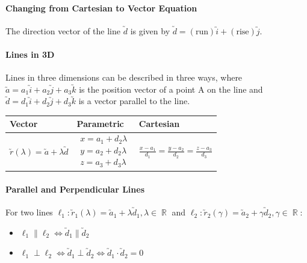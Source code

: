 \documentclass[a4paper,twoside]{article}
\DeclareMathOperator\R{\mathbb{R}}
\begin{document}
			\paragraph{Changing from Cartesian to Vector Equation} The direction vector of the line $\utilde{d}$ is given by $\utilde{d}=\mathrm{(run)}\utilde{i}+\mathrm{(rise)}\utilde{j}$.
			
			\paragraph{Lines in 3D} Lines in three dimensions can be described in three ways, where $\utilde{a}=a_1\utilde{i}+a_2\utilde{j}+a_3\utilde{k}$ is the position vector of a point A on the line and $\utilde{d}=d_1\utilde{i}+d_2\utilde{j}+d_3\utilde{k}$ is a vector parallel to the line.
			\begin{center}
				\bgroup
				\def\arraystretch{2}
				\begin{tabularx}{\textwidth}{|m{3cm}*2{|X}|}
					\hline
					\centering Vector & Parametric & Cartesian \\
					\hline
					\vspace{2em}
					\centering$\utilde{r}(\lambda)=\utilde{a}+\lambda\utilde{d}$ & $\begin{aligned}
						x=a_1+d_2\lambda \\[1em]
						y=a_2+d_2\lambda \\[1em]
						z=a_3+d_3\lambda
					\end{aligned}$ & \(\frac{x-a_1}{d_1}=\frac{y-a_2}{d_2}=\frac{z-a_3}{d_3}\) \\
					\hline
				\end{tabularx}
				\egroup
			\end{center}
			
			\paragraph{Parallel and Perpendicular Lines} For two lines $\ell_1:\utilde{r}_1(\lambda)=\utilde{a}_1+\lambda\utilde{d}_1,\lambda\in\R$ and $\ell_2:\utilde{r}_2(\gamma)=\utilde{a}_2+\gamma\utilde{d}_2,\gamma\in\R$:
			\begin{itemize}
				\item $\ell_1\parallel\ell_2 \iff \utilde{d}_1\parallel\utilde{d}_2$
				\item $\ell_1\perp\ell_2 \iff \utilde{d}_1\perp\utilde{d}_2 \iff \utilde{d}_1\cdot\utilde{d}_2=0$
			\end{itemize}
			
\end{document}
